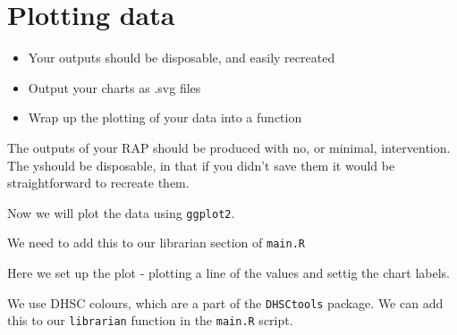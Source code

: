 \documentclass[
  letterpaper,
]{book}
\begin{document}

\hypertarget{sec-plot}{%
\chapter{Plotting data}\label{sec-plot}}

\begin{tcolorbox}[enhanced jigsaw, toprule=.15mm, left=2mm, colback=white, breakable, title=\textcolor{quarto-callout-note-color}{\faInfo}\hspace{0.5em}{Key Points}, colframe=quarto-callout-note-color-frame, opacitybacktitle=0.6, coltitle=black, titlerule=0mm, bottomrule=.15mm, rightrule=.15mm, bottomtitle=1mm, toptitle=1mm, arc=.35mm, leftrule=.75mm, opacityback=0, colbacktitle=quarto-callout-note-color!10!white]

\begin{itemize}
\item
  Your outputs should be disposable, and easily recreated
\item
  Output your charts as .svg files
\item
  Wrap up the plotting of your data into a function
\end{itemize}

\end{tcolorbox}

The outputs of your RAP should be produced with no, or minimal,
intervention. The yshould be disposable, in that if you didn't save them
it would be straightforward to recreate them.

Now we will plot the data using \texttt{ggplot2}.

We need to add this to our librarian section of \texttt{main.R}

Here we set up the plot - plotting a line of the values and settig the
chart labels.

We use DHSC colours, which are a part of the \texttt{DHSCtools} package.
We can add this to our \texttt{librarian} function in the
\texttt{main.R} script.
\end{document}
